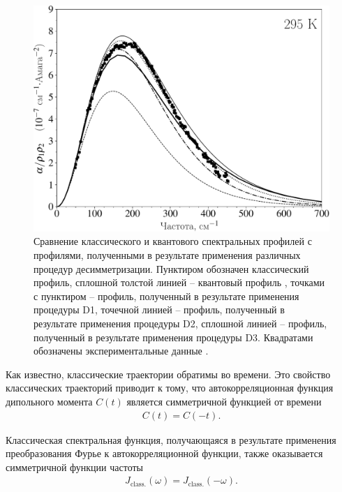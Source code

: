 \setcounter{figure}{3}
\begin{figure}
    \centering
    \includegraphics[width=0.7\linewidth]{./pictures/two_atom_spectra/desymmetrizations_295K-crop.pdf}
    \caption{Сравнение классического и квантового спектральных профилей с профилями, полученными в результате применения различных процедур десимметризации. Пунктиром обозначен классический профиль, сплошной толстой линией -- квантовый профиль \cite{buryak2014}, точками с пунктиром -- профиль, полученный в результате применения процедуры D1, точечной линией -- профиль, полученный в результате применения процедуры D2, сплошной линией -- профиль, полученный в результате применения процедуры D3. Квадратами обозначены экспериментальные данные \cite{bosomworth1965_part2}.}
    \label{fig:two-atom-desymmetrizations}
\end{figure}

Как известно, классические траектории обратимы во времени. Это свойство классических траекторий приводит к тому, что автокорреляционная функция дипольного момента $C(t)$ является симметричной функцией от времени \cite{frommhold}
\begin{gather}
    C(t) = C(-t).
\end{gather}

Классическая спектральная функция, получающаяся в результате применения преобразования Фурье к автокорреляционной функции, также оказывается симметричной функции частоты 
\begin{gather}
    J_\text{class.}(\omega) = J_\text{class.}(-\omega). \label{classical-detailed-balance}
\end{gather}

